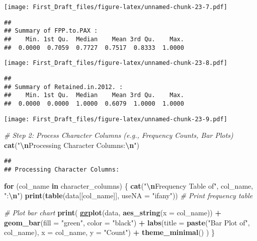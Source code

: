 \documentclass[
]{article}
\newenvironment{Shaded}{\begin{snugshade}}{\end{snugshade}}
\newcommand{\AttributeTok}[1]{\textcolor[rgb]{0.13,0.29,0.53}{#1}}
\newcommand{\CommentTok}[1]{\textcolor[rgb]{0.56,0.35,0.01}{\textit{#1}}}
\newcommand{\ControlFlowTok}[1]{\textcolor[rgb]{0.13,0.29,0.53}{\textbf{#1}}}
\newcommand{\FunctionTok}[1]{\textcolor[rgb]{0.13,0.29,0.53}{\textbf{#1}}}
\newcommand{\NormalTok}[1]{#1}
\newcommand{\SpecialCharTok}[1]{\textcolor[rgb]{0.81,0.36,0.00}{\textbf{#1}}}
\newcommand{\StringTok}[1]{\textcolor[rgb]{0.31,0.60,0.02}{#1}}
\begin{document}
\texttt{[image: First\_Draft\_files/figure-latex/unnamed-chunk-23-7.pdf]}

\begin{verbatim}
## 
## Summary of FPP.to.PAX :
##    Min. 1st Qu.  Median    Mean 3rd Qu.    Max. 
##  0.0000  0.7059  0.7727  0.7517  0.8333  1.0000
\end{verbatim}

\texttt{[image: First\_Draft\_files/figure-latex/unnamed-chunk-23-8.pdf]}

\begin{verbatim}
## 
## Summary of Retained.in.2012. :
##    Min. 1st Qu.  Median    Mean 3rd Qu.    Max. 
##  0.0000  0.0000  1.0000  0.6079  1.0000  1.0000
\end{verbatim}

\texttt{[image: First\_Draft\_files/figure-latex/unnamed-chunk-23-9.pdf]}

\begin{Shaded}
\begin{Highlighting}[]
\CommentTok{\# Step 2: Process Character Columns (e.g., Frequency Counts, Bar Plots)}
\FunctionTok{cat}\NormalTok{(}\StringTok{"}\SpecialCharTok{\textbackslash{}n}\StringTok{Processing Character Columns:}\SpecialCharTok{\textbackslash{}n}\StringTok{"}\NormalTok{)}
\end{Highlighting}
\end{Shaded}

\begin{verbatim}
## 
## Processing Character Columns:
\end{verbatim}

\begin{Shaded}
\begin{Highlighting}[]
\ControlFlowTok{for}\NormalTok{ (col\_name }\ControlFlowTok{in}\NormalTok{ character\_columns) \{}
  \FunctionTok{cat}\NormalTok{(}\StringTok{"}\SpecialCharTok{\textbackslash{}n}\StringTok{Frequency Table of"}\NormalTok{, col\_name, }\StringTok{":}\SpecialCharTok{\textbackslash{}n}\StringTok{"}\NormalTok{)}
  \FunctionTok{print}\NormalTok{(}\FunctionTok{table}\NormalTok{(data[[col\_name]], }\AttributeTok{useNA =} \StringTok{"ifany"}\NormalTok{))  }\CommentTok{\# Print frequency table}
  
  \CommentTok{\# Plot bar chart}
  \FunctionTok{print}\NormalTok{(}
    \FunctionTok{ggplot}\NormalTok{(data, }\FunctionTok{aes\_string}\NormalTok{(}\AttributeTok{x =}\NormalTok{ col\_name)) }\SpecialCharTok{+}
      \FunctionTok{geom\_bar}\NormalTok{(}\AttributeTok{fill =} \StringTok{"green"}\NormalTok{, }\AttributeTok{color =} \StringTok{"black"}\NormalTok{) }\SpecialCharTok{+}
      \FunctionTok{labs}\NormalTok{(}\AttributeTok{title =} \FunctionTok{paste}\NormalTok{(}\StringTok{"Bar Plot of"}\NormalTok{, col\_name), }\AttributeTok{x =}\NormalTok{ col\_name, }\AttributeTok{y =} \StringTok{"Count"}\NormalTok{) }\SpecialCharTok{+}
      \FunctionTok{theme\_minimal}\NormalTok{()}
\NormalTok{  )}
\NormalTok{\}}
\end{Highlighting}
\end{Shaded}
\end{document}
